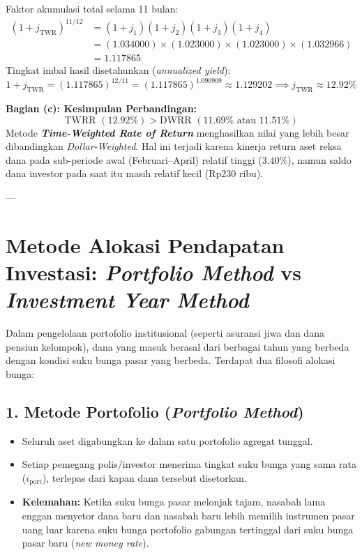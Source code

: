 \documentclass[11pt,a4paper]{article}
\begin{document}
\begin{examplebox}
Faktor akumulasi total selama 11 bulan:
\begin{align*}
    (1 + j_{\text{TWR}})^{11/12} &= (1 + j_1)(1 + j_2)(1 + j_3)(1 + j_4) \\
                                 &= (1.034000) \times (1.023000) \times (1.023000) \times (1.032966) \\
                                 &= 1.117865
\end{align*}
Tingkat imbal hasil disetahunkan (\textit{annualized yield}):
\begin{equation*}
    1 + j_{\text{TWR}} = (1.117865)^{12/11} = (1.117865)^{1.090909} \approx 1.129202 \implies j_{\text{TWR}} \approx 12.92\%
\end{equation*}

\textbf{Bagian (c): Kesimpulan Perbandingan:}
\begin{equation*}
    \text{TWRR } (12.92\%) > \text{DWRR } (11.69\% \text{ atau } 11.51\%)
\end{equation*}
Metode \textbf{\textit{Time-Weighted Rate of Return}} menghasilkan nilai yang lebih besar dibandingkan \textit{Dollar-Weighted}. Hal ini terjadi karena kinerja return aset reksa dana pada sub-periode awal (Februari--April) relatif tinggi ($3.40\%$), namun saldo dana investor pada saat itu masih relatif kecil ($\text{Rp}230$ ribu).
\end{examplebox}

---

\section{Metode Alokasi Pendapatan Investasi: \textit{Portfolio Method} vs \textit{Investment Year Method}}

Dalam pengelolaan portofolio institusional (seperti asuransi jiwa dan dana pensiun kelompok), dana yang masuk berasal dari berbagai tahun yang berbeda dengan kondisi suku bunga pasar yang berbeda. Terdapat dua filosofi alokasi bunga:

\subsection{1. Metode Portofolio (\textit{Portfolio Method})}
\begin{itemize}[leftmargin=1.5em]
    \item Seluruh aset digabungkan ke dalam satu portofolio agregat tunggal.
    \item Setiap pemegang polis/investor menerima tingkat suku bunga yang sama rata ($i_{\text{port}}$), terlepas dari kapan dana tersebut disetorkan.
    \item \textbf{Kelemahan:} Ketika suku bunga pasar melonjak tajam, nasabah lama enggan menyetor dana baru dan nasabah baru lebih memilih instrumen pasar uang luar karena suku bunga portofolio gabungan tertinggal dari suku bunga pasar baru (\textit{new money rate}).
\end{itemize}
\end{document}
